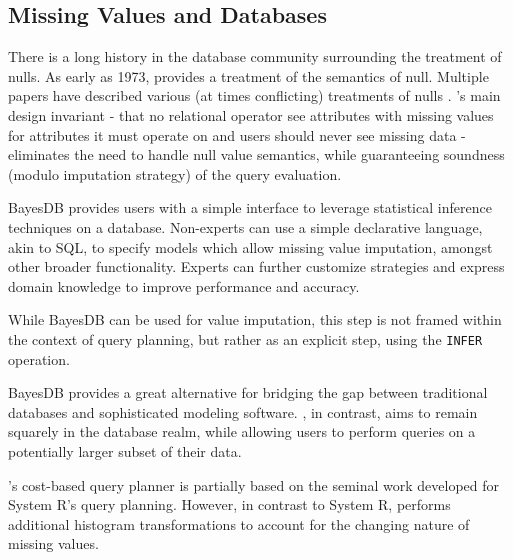 \subsection{Missing Values and Databases}
There is a long history in the database community surrounding the
treatment of nulls. As early as 1973, \cite{codd1973understanding}
provides a treatment of the semantics of null. Multiple
papers have described various (at times conflicting) treatments
of nulls \cite{grant1977null}. \ProjectName's main design invariant - that no relational operator
see attributes with missing values for attributes it must operate on and users should never see
missing data - eliminates
the need to handle null value semantics, while guaranteeing soundness (modulo
imputation strategy) of the query evaluation.

BayesDB \cite{mansinghka2015bayesdb} provides users with a simple interface to 
leverage statistical inference techniques on a database. Non-experts
can use a simple declarative language, akin to SQL, to specify models
which allow missing value imputation, amongst other broader functionality.
Experts can further customize strategies and express domain knowledge to
improve performance and accuracy.

While BayesDB can be used for value imputation, this step is not framed
within the context of query planning, but rather as an explicit step, using the
\verb|INFER| operation. 

BayesDB provides a great alternative for bridging the gap between
traditional databases and sophisticated modeling software. \ProjectName{}, in
contrast, aims to remain squarely in the database realm, while allowing
users to perform queries on a potentially larger subset of their data.

\ProjectName's cost-based query planner 
is partially based on the seminal work developed for System R's query planning\cite{blasgen1981system}.
However, in contrast to System R, \ProjectName{} performs additional histogram transformations to account
for the changing nature of missing values.





